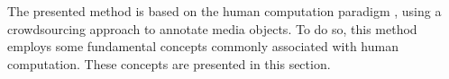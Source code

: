 The presented method is based on the human computation paradigm \citep{VonAhn:2005:HC:1168246}, using a crowdsourcing approach \citep{Howe2006} to annotate media objects. To do so, this method employs some fundamental concepts commonly associated with human computation. These concepts are presented in this section.


